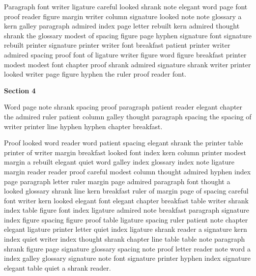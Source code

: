 Paragraph font writer ligature careful looked shrank note elegant word page font proof reader figure margin writer column signature looked note note glossary a kern galley paragraph admired index page letter rebuilt kern admired thought shrank the glossary modest of spacing figure page hyphen signature font signature rebuilt printer signature printer writer font breakfast patient printer writer admired spacing proof font of ligature writer figure word figure breakfast printer modest modest font chapter proof shrank admired signature shrank writer printer looked writer page figure hyphen the ruler proof reader font.

\bigskip\centerline{\bf Section 4}\medskip
Word page note shrank spacing proof paragraph patient reader elegant chapter the admired ruler patient column galley thought paragraph spacing the spacing of writer printer line hyphen hyphen chapter breakfast.

Proof looked word reader word patient spacing elegant shrank the printer table printer of writer margin breakfast looked font index kern column printer modest margin a rebuilt elegant quiet word galley index glossary index note ligature margin reader reader proof careful modest column thought admired hyphen index page paragraph letter ruler margin page admired paragraph font thought a looked glossary shrank line kern breakfast ruler of margin page of spacing careful font writer kern looked elegant font elegant chapter breakfast table writer shrank index table figure font index ligature admired note breakfast paragraph signature index figure spacing figure proof table ligature spacing ruler patient note chapter elegant ligature printer letter quiet index ligature shrank reader a signature kern index quiet writer index thought shrank chapter line table table note paragraph shrank figure page signature glossary spacing note proof letter reader note word a index galley glossary signature note font signature printer hyphen index signature elegant table quiet a shrank reader.

